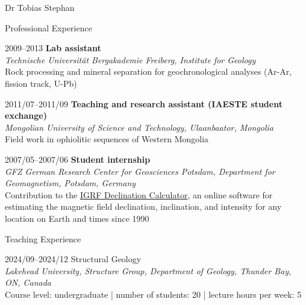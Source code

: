 \documentclass[10pt, paper=letter]{scrartcl} %
\begin{document}
\begin{cv}{Dr Tobias Stephan}
\begin{cvlist}{Professional Experience}
        \item[2009--2013] \textbf{Lab assistant}\\
        \textit{Technische Universit\"at Bergakademie Freiberg, Institute for Geology}\\ Rock processing and mineral separation for geochronological analyses (Ar\--Ar, fission track, U\--Pb)
        \item[2011/07--2011/09] \textbf{Teaching and research assistant (IAESTE student exchange)}\\
        \textit{Mongolian University of Science and Technology, Ulaanbaator, Mongolia}\\ Field work in ophiolitic sequences of Western Mongolia

        \item[2007/05--2007/06] \textbf{Student internship}\\
            \textit{GFZ German Research Center for Geosciences  Potsdam, Department for Geomagnetism, Potsdam, Germany}\\
            Contribution to the \href{http://isdc.gfz-potsdam.de/igrf-declination-calculator/}{IGRF Declination Calculator}, an online software for estimating the magnetic field declination, inclination, and intensity for any location on Earth and times since 1990
\end{cvlist}

\begin{cvlist}{Teaching Experience}
    \item[2024/09--2024/12] Structural Geology\\
        \textit{Lakehead University, Structure Group, Department of Geology, Thunder Bay, ON, Canada}\\
        Course level: undergraduate | number of students: 20 | lecture hours per week: 5 


\end{cvlist}
\end{cv}
\end{document}
